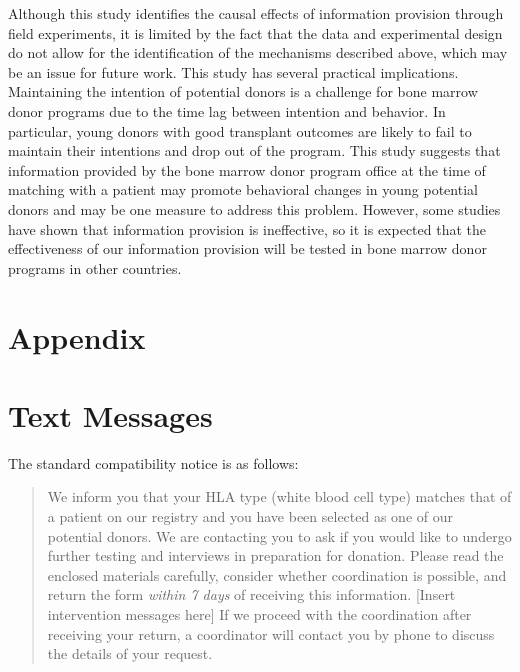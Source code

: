 \documentclass[12pt, a4paper]{article}
\begin{document}
Although this study identifies the causal effects of information provision through field experiments, it is limited by the fact that the data and experimental design do not allow for the identification of the mechanisms described above, which may be an issue for future work. This study has several practical implications. Maintaining the intention of potential donors is a challenge for bone marrow donor programs due to the time lag between intention and behavior. In particular, young donors with good transplant outcomes are likely to fail to maintain their intentions and drop out of the program. This study suggests that information provided by the bone marrow donor program office at the time of matching with a patient may promote behavioral changes in young potential donors and may be one measure to address this problem. However, some studies \citep[for example,][]{Switzer2018} have shown that information provision is ineffective, so it is expected that the effectiveness of our information provision will be tested in bone marrow donor programs in other countries.

\clearpage

\appendix

\hypertarget{appendix}{%
\section*{Appendix}\label{appendix}}

\hypertarget{message}{%
\section{Text Messages}\label{message}}

The standard compatibility notice is as follows:

\begin{quote}
We inform you that your HLA type (white blood cell type) matches that of a patient on our registry and you have been selected as one of our potential donors. We are contacting you to ask if you would like to undergo further testing and interviews in preparation for donation. Please read the enclosed materials carefully, consider whether coordination is possible, and return the form \emph{within 7 days} of receiving this information. {[}Insert intervention messages here{]} If we proceed with the coordination after receiving your return, a coordinator will contact you by phone to discuss the details of your request.
\end{quote}
\end{document}
